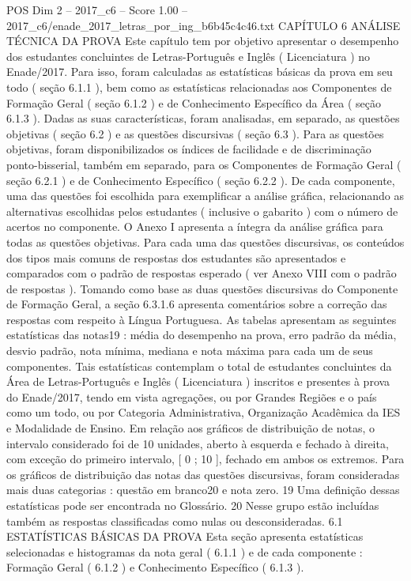 \begin{textsample}{POS Dim 2 – 2017\_c6 – Score 1.00 – 2017\_c6/enade\_2017\_letras\_por\_ing\_b6b45c4c46.txt}  \label{ex:f2_pos_267}
CAPÍTULO 6 ANÁLISE TÉCNICA DA PROVA Este capítulo tem por objetivo apresentar o desempenho dos estudantes concluintes de Letras-Português e Inglês ( Licenciatura ) no Enade/2017.
Para isso, foram calculadas as estatísticas básicas da prova em seu todo ( seção 6.1.1 ), bem como as estatísticas relacionadas aos Componentes de Formação Geral ( seção 6.1.2 ) e de Conhecimento Específico da Área ( seção 6.1.3 ).
Dadas as suas características, foram analisadas, em separado, as questões objetivas ( seção 6.2 ) e as questões discursivas ( seção 6.3 ).
Para as questões objetivas, foram disponibilizados os índices de facilidade e de discriminação ponto-bisserial, também em separado, para os Componentes de Formação Geral ( seção 6.2.1 ) e de Conhecimento Específico ( seção 6.2.2 ).
De cada componente, uma das questões foi escolhida para exemplificar a análise gráfica, relacionando as alternativas escolhidas pelos estudantes ( inclusive o gabarito ) com o número de acertos no componente.
O Anexo I apresenta a íntegra da análise gráfica para todas as questões objetivas.
Para cada uma das questões discursivas, os conteúdos dos tipos mais comuns de respostas dos estudantes são apresentados e comparados com o padrão de respostas esperado ( ver Anexo VIII com o padrão de respostas ).
Tomando como base as duas questões discursivas do Componente de Formação Geral, a seção 6.3.1.6 apresenta comentários sobre a correção das respostas com respeito à Língua Portuguesa.
As tabelas apresentam as seguintes estatísticas das notas19 : média do desempenho na prova, erro padrão da média, desvio padrão, nota mínima, mediana e nota máxima para cada um de seus componentes.
Tais estatísticas contemplam o total de estudantes concluintes da Área de Letras-Português e Inglês ( Licenciatura ) inscritos e presentes à prova do Enade/2017, tendo em vista agregações, ou por Grandes Regiões e o país como um todo, ou por Categoria Administrativa, Organização Acadêmica da IES e Modalidade de Ensino.
Em relação aos gráficos de distribuição de notas, o intervalo considerado foi de 10 unidades, aberto à esquerda e fechado à direita, com exceção do primeiro intervalo, [ 0 ; 10 ], fechado em ambos os extremos.
Para os gráficos de distribuição das notas das questões discursivas, foram consideradas mais duas categorias : questão em branco20 e nota zero. 19 Uma definição dessas estatísticas pode ser encontrada no Glossário. 20 Nesse grupo estão incluídas também as respostas classificadas como nulas ou desconsideradas. 6.1 ESTATÍSTICAS BÁSICAS DA PROVA Esta seção apresenta estatísticas selecionadas e histogramas da nota geral ( 6.1.1 ) e de cada componente : Formação Geral ( 6.1.2 ) e Conhecimento Específico ( 6.1.3 ).

\end{textsample}
